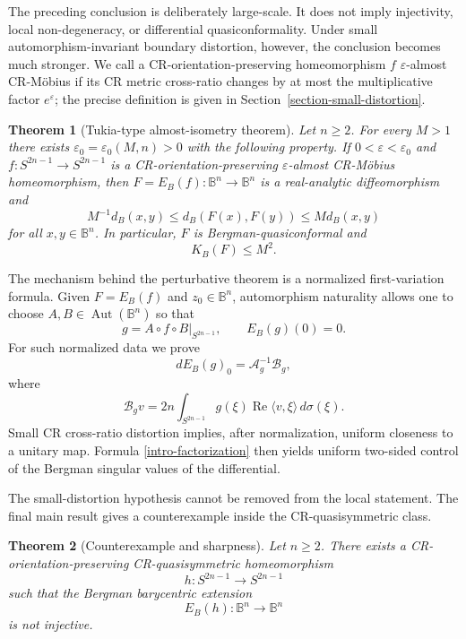 \documentclass[11pt]{article}
\newtheorem{theorem}{Theorem}[section]
\theoremstyle{definition}
\theoremstyle{remark}
\theoremstyle{definition}
\newcommand{\B}{\mathbb B}
\newcommand{\Aut}{\operatorname{Aut}}
\newcommand{\Real}{\operatorname{Re}}
\begin{document}
The preceding conclusion is deliberately large-scale.  It does not imply
injectivity, local non-degeneracy, or differential quasiconformality.  Under
small automorphism-invariant boundary distortion, however, the conclusion
becomes much stronger.  We call a CR-orientation-preserving homeomorphism
\(f\) \(\varepsilon\)-almost CR-M\"obius if its CR metric cross-ratio changes
by at most the multiplicative factor \(e^{\varepsilon}\); the precise
definition is given in Section~\ref{section-small-distortion}.

\begin{theorem}[Tukia-type almost-isometry theorem]
\label{theorem-tukia-type-almost-isometry}
Let \(n\ge2\).  For every \(M>1\) there exists
\(\varepsilon_0=\varepsilon_0(M,n)>0\) with the following property.  If
\(0<\varepsilon<\varepsilon_0\) and
\(f:S^{2n-1}\to S^{2n-1}\) is a CR-orientation-preserving
\(\varepsilon\)-almost CR-M\"obius homeomorphism, then
\(F=E_B(f):\B^n\to\B^n\) is a real-analytic diffeomorphism and
\begin{equation}\label{tukia-type-distance-estimate}
        M^{-1}d_B(x,y)
        \le d_B(F(x),F(y))
        \le M d_B(x,y)
\end{equation}
for all \(x,y\in\B^n\).  In particular, \(F\) is Bergman-quasiconformal and
\[
        K_B(F)\le M^2.
\]
\end{theorem}

The mechanism behind the perturbative theorem is a normalized first-variation
formula.  Given \(F=E_B(f)\) and \(z_0\in\B^n\), automorphism naturality allows
one to choose \(A,B\in\Aut(\B^n)\) so that
\[
        g=A\circ f\circ B|_{S^{2n-1}},
        \qquad E_B(g)(0)=0.
\]
For such normalized data we prove
\begin{equation}\label{intro-factorization}
        dE_B(g)_0=\mathcal A_g^{-1}\mathcal B_g,
\end{equation}
where
\[
        \mathcal B_gv
        =2n\int_{S^{2n-1}}
        g(\xi)\Real\langle v,\xi\rangle\,d\sigma(\xi).
\]
Small CR cross-ratio distortion implies, after normalization, uniform
closeness to a unitary map.  Formula \eqref{intro-factorization} then yields
uniform two-sided control of the Bergman singular values of the differential.

The small-distortion hypothesis cannot be removed from the local statement.
The final main result gives a counterexample inside the CR-quasisymmetric
class.

\begin{theorem}[Counterexample and sharpness]\label{theorem-cr-qs-counterexample}
Let \(n\ge2\).  There exists a CR-orientation-preserving CR-quasisymmetric
homeomorphism
\[
        h:S^{2n-1}\to S^{2n-1}
\]
such that the Bergman barycentric extension
\[
        E_B(h):\B^n\to\B^n
\]
is not injective.
\end{theorem}
\end{document}
